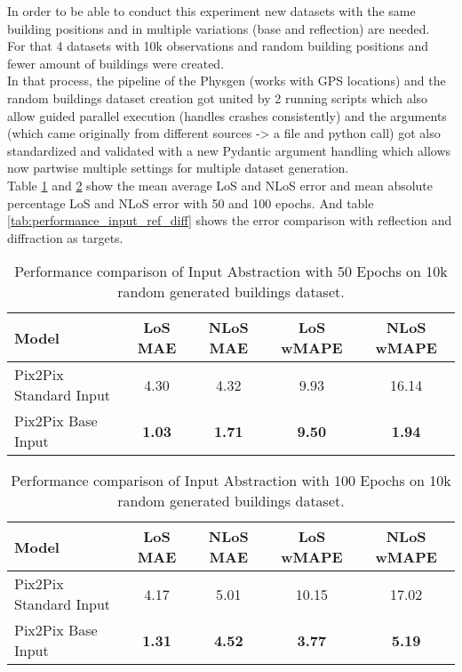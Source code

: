 		In order to be able to conduct this experiment new datasets with the same building positions and in multiple variations (base and reflection) are needed. \\For that 4 datasets with 10k observations and random building positions and fewer amount of buildings were created.\\
		In that process, the pipeline of the Physgen (works with GPS locations) and the random buildings dataset creation got united by 2 running scripts which also allow guided parallel execution (handles crashes consistently) and the arguments (which came originally from different sources -> a file and python call) got also standardized and validated with a new Pydantic \cite{pydantic} argument handling which allows now partwise multiple settings for multiple dataset generation.\\
		Table \ref{tab:performance_input_50} and \ref{tab:performance_input_100} show the mean average LoS and NLoS error and mean absolute percentage LoS and NLoS error with 50 and 100 epochs. And table \ref{tab:performance_input_ref_diff} shows the error comparison with reflection and diffraction as targets.
		
		\begin{table}[h!]
			\centering
			\begin{tabular}{|l|c|c|c|c|}
				\hline
				\textbf{Model} & \textbf{LoS MAE} & \textbf{NLoS MAE} & \textbf{LoS wMAPE} & \textbf{NLoS wMAPE} \\
				\hline
				Pix2Pix Standard Input & 4.30 & 4.32 & 9.93 & 16.14 \\
				Pix2Pix Base Input & \textbf{1.03} & \textbf{1.71} & \textbf{9.50} & \textbf{1.94} \\
				\hline
			\end{tabular}
			\caption{Performance comparison of Input Abstraction with 50 Epochs on 10k random generated buildings dataset.}
			\label{tab:performance_input_50}
		\end{table}
		
		\begin{table}[h!]
			\centering
			\begin{tabular}{|l|c|c|c|c|}
				\hline
				\textbf{Model} & \textbf{LoS MAE} & \textbf{NLoS MAE} & \textbf{LoS wMAPE} & \textbf{NLoS wMAPE} \\
				\hline
				Pix2Pix Standard Input & 4.17 & 5.01 & 10.15 & 17.02 \\
				Pix2Pix Base Input & \textbf{1.31} & \textbf{4.52} & \textbf{3.77} & \textbf{5.19} \\
				\hline
			\end{tabular}
			\caption{Performance comparison of Input Abstraction with 100 Epochs on 10k random generated buildings dataset.}
			\label{tab:performance_input_100}
		\end{table}
		
